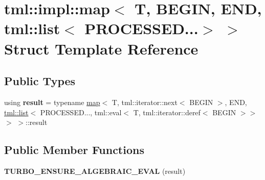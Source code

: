 \hypertarget{structtml_1_1impl_1_1map_3_01_t_00_01_b_e_g_i_n_00_01_e_n_d_00_01tml_1_1list_3_01_p_r_o_c_e_s_s_e_d_8_8_8_4_01_4}{\section{tml\+:\+:impl\+:\+:map$<$ T, B\+E\+G\+I\+N, E\+N\+D, tml\+:\+:list$<$ P\+R\+O\+C\+E\+S\+S\+E\+D...$>$ $>$ Struct Template Reference}
\label{structtml_1_1impl_1_1map_3_01_t_00_01_b_e_g_i_n_00_01_e_n_d_00_01tml_1_1list_3_01_p_r_o_c_e_s_s_e_d_8_8_8_4_01_4}
}
\subsection*{Public Types}
\begin{DoxyCompactItemize}
\item 
\hypertarget{structtml_1_1impl_1_1map_3_01_t_00_01_b_e_g_i_n_00_01_e_n_d_00_01tml_1_1list_3_01_p_r_o_c_e_s_s_e_d_8_8_8_4_01_4_aae8d6a098963e5e1bdc4121f7bc8e69b}{using {\bfseries result} = typename \hyperlink{structtml_1_1impl_1_1map}{map}$<$ T, tml\+::iterator\+::next$<$ B\+E\+G\+I\+N $>$, E\+N\+D, \hyperlink{structtml_1_1list}{tml\+::list}$<$ P\+R\+O\+C\+E\+S\+S\+E\+D..., tml\+::eval$<$ T, tml\+::iterator\+::deref$<$ B\+E\+G\+I\+N $>$$>$$>$ $>$\+::result}\label{structtml_1_1impl_1_1map_3_01_t_00_01_b_e_g_i_n_00_01_e_n_d_00_01tml_1_1list_3_01_p_r_o_c_e_s_s_e_d_8_8_8_4_01_4_aae8d6a098963e5e1bdc4121f7bc8e69b}

\end{DoxyCompactItemize}
\subsection*{Public Member Functions}
\begin{DoxyCompactItemize}
\item 
\hypertarget{structtml_1_1impl_1_1map_3_01_t_00_01_b_e_g_i_n_00_01_e_n_d_00_01tml_1_1list_3_01_p_r_o_c_e_s_s_e_d_8_8_8_4_01_4_af1b631e933db2783e29642dd45021dea}{{\bfseries T\+U\+R\+B\+O\+\_\+\+E\+N\+S\+U\+R\+E\+\_\+\+A\+L\+G\+E\+B\+R\+A\+I\+C\+\_\+\+E\+V\+A\+L} (result)}\label{structtml_1_1impl_1_1map_3_01_t_00_01_b_e_g_i_n_00_01_e_n_d_00_01tml_1_1list_3_01_p_r_o_c_e_s_s_e_d_8_8_8_4_01_4_af1b631e933db2783e29642dd45021dea}

\end{DoxyCompactItemize}


